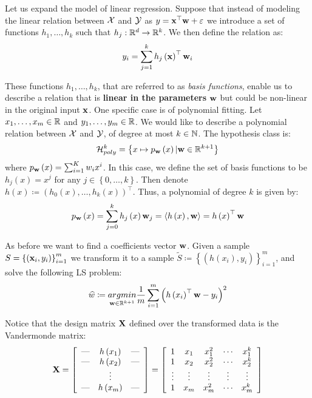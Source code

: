 Let us expand the model of linear regression. Suppose that instead of modeling the linear relation between $\mathcal{X}$ and $\mathcal{Y}$ as $y=\mathbf{x}^\top\mathbf{w}+\varepsilon$ we introduce a set of functions $h_1,\ldots,h_k$ such that $h_j:\mathbb{R}^d\rightarrow\mathbb{R}^k$. We then define the relation as: $$y_i=\sum_{j=1}^kh_j\left(\mathbf{x}\right)^\top\mathbf{w}_i$$

These functions $h_1,\ldots,h_k$, that are referred to as \textit{basis functions}, enable us to describe a relation that is \textbf{linear in the parameters} $\mathbf{w}$ but could be non-linear in the original input $\mathbf{x}$. One specific case is of polynomial fitting. Let $x_1,\ldots,x_m\in\mathbb{R}$ and $y_1,\ldots,y_m\in\mathbb{R}$. We would like to describe a polynomial relation between $\mathcal{X}$ and $\mathcal{Y}$, of degree at most $k\in\mathbb{N}$. The hypothesis class is: 
\begin{equation}
\mathcal{H}^k_{poly}=\left\{x\mapsto p_{\mathbf{w}}\left(x\right)| \mathbf{w}\in\mathbb{R}^{k+1}\right\}
\label{eqn:poly_reg}
\end{equation}
where $p_{\mathbf{w}}\left(x\right)=\sum^{K}_{i=1}w_i x^i$. In this case, we define the set of basis functions to be $h_j\left(x\right)=x^j$ for any $j\in\left\{0,\ldots,k\right\}$. Then denote $h\left(x\right)\coloneqq\left(h_0\left(x\right),\ldots,h_k\left(x\right)\right)^\top$. Thus, a polynomial of degree $k$ is given by:
$$ p_{\mathbf{w}}\left(x\right)=\sum^k_{j=0}h_j\left(x\right)\mathbf{w}_j= \left\langle h\left(x\right),\mathbf{w}\right\rangle =h\left(x\right)^{\top} \mathbf{w} $$

As before we want to find a coefficients vector $\mathbf{w}$. Given a sample $S=\left\{\left(\mathbf{x}_i,y_i\right)\right\}^m_{i=1}$ we transform it to a sample $\widetilde{S}\coloneqq\left\{\left(h\left(x_i\right),y_i\right)\right\}^m_{i=1}$, and solve the following LS problem: $$ \widehat{w}\coloneqq\underset{\mathbf{w}\in\mathbb{R}^{k+1}}{argmin}\frac{1}{m}\sum^m_{i=1}\left(h\left(x_i\right)^\top \mathbf{w} -y_i\right)^2 $$

Notice that the design matrix $\mathbf{X}$ defined over the transformed data is the Vandermonde matrix:
$$
\mathbf{X} =
\left[
\begin{array}{ccc}
\hbox{---} & h\left(x_1\right) & \hbox{---} \\
\hbox{---} & h\left(x_2\right) & \hbox{---} \\
& \vdots    & \\
\hbox{---} & h\left(x_m\right) & \hbox{---}
\end{array}
\right] = 
\left[
\begin{array}{ccccc}
1 & x_1 & x_1^2 & \cdots & x_1^k \\
1 & x_2 & x_2^2 & \cdots & x_2^k \\
\vdots & \vdots & \vdots & \vdots & \vdots \\
1 & x_m & x_m^2 & \cdots & x_m^k
\end{array}
\right]
$$

